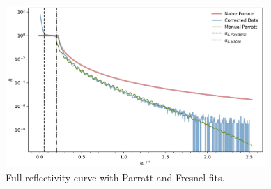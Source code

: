 \begin{figure}[H]
	\centering
	\includegraphics[width=0.88\textwidth]{content/plots/8.jpg}
	\caption{Full reflectivity curve with Parratt and Fresnel fits.}
	\label{fig:parratt-fresnel}
\end{figure}
